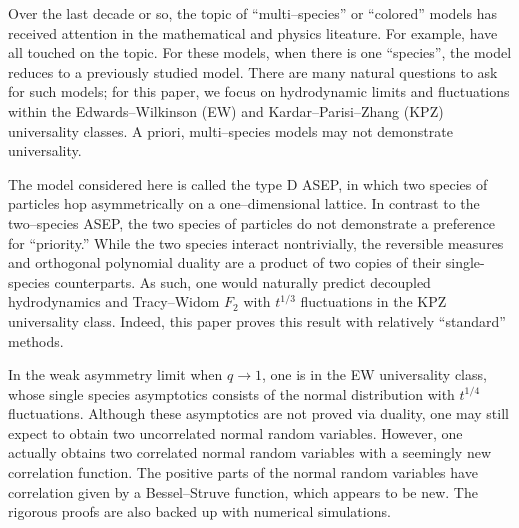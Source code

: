 \documentclass[11pt]{article}
\theoremstyle{plain}
\theoremstyle{definition}
\theoremstyle{remark}
\begin{document}
Over the last decade or so, the topic of ``multi--species'' or ``colored'' models has received attention in the mathematical and physics liteature. For example,    \cite{Spohn14, FSS, PSSS, SpohnStoltz, PSS, MendlSpohn, vanBeijeren, DDSMS, SpohnReview, FunakiHoshino, KupiainenMarcozzi, ButelmannMF,
  CdGHSU, NejjarMixing, FerrariNejjar, NejjarHard, ACH, BalazsSeppalainen, FerrariMartin, ANP, BorodinWheeler, AggarwalBorodin, FerrariKipnis,
  CasiniGR, FKZ, CGMO, KuanZhou, GroeneveltWagenaar, Wagenaar, AyalaZimmer, DaCunhaSasada, CCGO, CasiniFG, dNBD, Doyon, DPSY, DEHP,
  CorteelWilliams, CdGW, KMO, Martin, RDKKS, SKP, WCS} have all touched on the topic. For these models, when there is one ``species'', the model reduces to a previously studied model. There are many natural questions to ask for such models; for this paper, we focus on hydrodynamic limits and fluctuations within the Edwards--Wilkinson (EW) and Kardar--Parisi--Zhang (KPZ) universality classes. A priori, multi--species models may not demonstrate universality. 
  
  The model considered here is called the type D ASEP, in which two species of particles hop asymmetrically on a one--dimensional lattice. In contrast to the two--species ASEP, the two species of particles do not demonstrate a preference for ``priority.'' While the two species interact nontrivially, the reversible measures and orthogonal polynomial duality are a product of two copies of their single-species counterparts.  As such, one would naturally predict decoupled hydrodynamics and Tracy--Widom $F_2$ with $t^{1/3}$ fluctuations in the KPZ universality class. Indeed, this paper proves this result with relatively ``standard'' methods. 
  
 In the weak asymmetry limit when $q\rightarrow 1$, one is in the EW universality class, whose single species asymptotics consists of the normal distribution with $t^{1/4}$ fluctuations. Although these asymptotics are not proved via duality, one may still expect to obtain two uncorrelated normal random variables. However, one actually obtains two correlated normal random variables with a seemingly new correlation function. The positive parts of the normal random variables have correlation given by a Bessel--Struve function, which appears to be new. The rigorous proofs are also backed up with numerical simulations.
  
  
\end{document}
